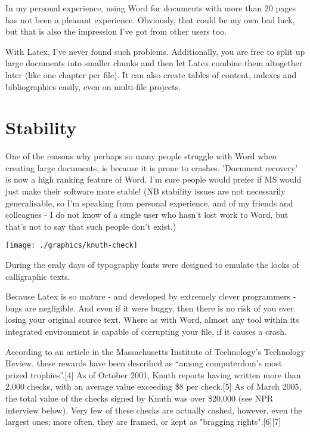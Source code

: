 In my personal experience, using Word for documents with more than 20 pages has not been a pleasant experience. Obviously, that could be my own bad luck, but that is also the impression I've got from other users too.

With Latex, I've never found such problems. Additionally, you are free to split up large documents into smaller chunks and then let Latex combine them altogether later (like one chapter per file). It can also create tables of content, indexes and bibliographies easily, even on multi-file projects.

\section{Stability}
One of the reasons why perhaps so many people struggle with Word when creating large documents, is because it is prone to crashes. 'Document recovery' is now a high ranking feature of Word. I'm sure people would prefer if MS would just make their software more stable! (NB stability issues are not necessarily generalisable, so I'm speaking from personal experience, and of my friends and colleagues - I do not know of a single user who hasn't lost work to Word, but that's not to say that such people don't exist.)
\begin{marginfigure}%
  \texttt{[image: ./graphics/knuth-check]}
  \caption{During the eraly days of typography fonts were designed to emulate the looks of calligraphic texts.}
  \label{fig:knuth}
\end{marginfigure}


Because Latex is so mature - and developed by extremely clever programmers - bugs are negligible. And even if it were buggy, then there is no risk of you ever losing your original source text. Where as with Word, almost any tool within its integrated environment is capable of corrupting your file, if it causes a crash.

According to an article in the Massachusetts Institute of Technology's Technology Review, these rewards have been described as ``among computerdom's most prized trophies''.[4] As of October 2001, Knuth reports having written more than 2,000 checks, with an average value exceeding \$8 per check.[5] As of March 2005, the total value of the checks signed by Knuth was over \$20,000 (see NPR interview below). Very few of these checks are actually cashed, however, even the largest ones; more often, they are framed, or kept as "bragging rights".[6][7]

